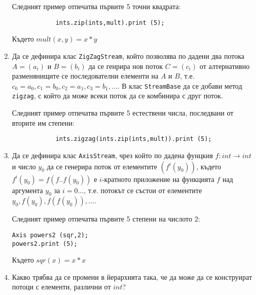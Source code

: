 \documentclass[12pt,a4paper]{article}
\begin{document}
\begin{enumerate}
	Следният пример отпечатва първите 5 точни квадрата:
	\begin{verbatim}
			ints.zip(ints,mult).print (5);
	\end{verbatim}
	 Където $mult(x,y)=x*y$

	 \item Да се дефинира клас \texttt{ZigZagStream}, който позволява по дадени два потока $A=(a_i)$ и $B=(b_i)$ да се генрира нов поток $C=(c_i)$ от алтернативно разменянищите се последователни елементи на $A$ и $B$, т.е. $c_0=a_0, c_1=b_0, c_2=a_1, c_3=b_1,...$. В клас \texttt{StreamBase} да се добави метод \texttt{zigzag}, с който да може всеки поток да се комбинира с друг поток.

	 Следният пример отпечатва първите 5 естествени числа, последвани от вторите им степени:
	 \begin{verbatim}
	 		ints.zigzag(ints.zip(ints,mult)).print (5);
	 \end{verbatim}

	 \item Да се дефинира клас \texttt{AxisStream}, чрез който по дадена фунцкия $f:int\rightarrow int$ и число $y_0$ да се генерира поток от елементите $(f^i(y_0))$, където $f^i(y_0)=f(f..f(y_0))$ е $i$-кратното приложение на функцията $f$ над аргумента $y_0$ за $i=0...$, т.е. потокът се състои от елементите $y_0, f(y_0),f(f(y_0)),...$.

	 Следният пример отпечатва първите 5 степени на числото 2:
	 \begin{verbatim}
Axis powers2 (sqr,2);
powers2.print (5);
	 \end{verbatim}
	 Където $sqr(x)=x*x$


	 \item Какво трябва да се промени в йерархията така, че да може да се конструират потоци с елементи, различни от $int$?

\end{enumerate}


	\vspace{20px}
\end{document}
